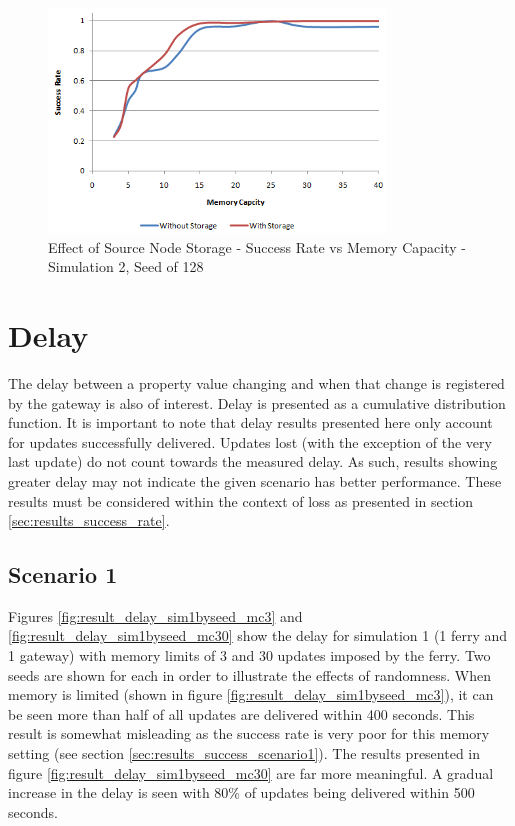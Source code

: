\begin{figure}[htbp]
    \centering
    \includegraphics[width=0.8\textwidth]{images/result_sccess_sim2byss_128}
    \caption{Effect of Source Node Storage - Success Rate vs Memory Capacity - Simulation 2, Seed of 128}
    \label{fig:result_sccess_sim2byss_128}
\end{figure}


\section{Delay}
\label{sec:results_delay}
The delay between a property value changing and when that change is registered by the gateway is also of interest.
Delay is presented as a cumulative distribution function.
%
It is important to note that delay results presented here only account for updates successfully delivered.
Updates lost (with the exception of the very last update) do not count towards the measured delay.
As such, results showing greater delay may not indicate the given scenario has better performance.
These results must be considered within the context of loss as presented in section \ref{sec:results_success_rate}.

\subsection{Scenario 1}

Figures \ref{fig:result_delay_sim1byseed_mc3} and \ref{fig:result_delay_sim1byseed_mc30} show the delay for simulation 1 (1 ferry and 1 gateway) with memory limits of 3 and 30 updates imposed by the ferry.
Two seeds are shown for each in order to illustrate the effects of randomness.
When memory is limited (shown in figure \ref{fig:result_delay_sim1byseed_mc3}), it can be seen more than half of all updates are delivered within 400 seconds. 
This result is somewhat misleading as the success rate is very poor for this memory setting (see section \ref{sec:results_success_scenario1}).
The results presented in figure \ref{fig:result_delay_sim1byseed_mc30} are far more meaningful.
A gradual increase in the delay is seen with 80\% of updates being delivered within 500 seconds.

